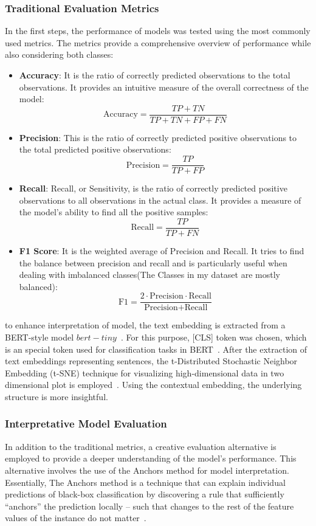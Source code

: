 \documentclass[11pt,a4paper]{article}
\begin{document}
\subsubsection{Traditional Evaluation Metrics}
In the first steps, the performance of models was tested using the most commonly used metrics. The metrics provide a comprehensive overview of performance while also considering both classes:
\begin{itemize}
    \item \textbf{Accuracy}: It is the ratio of correctly predicted observations to the total observations. It provides an intuitive measure of the overall correctness of the model:
    $$
    \text{Accuracy} = \frac{TP+TN}{TP+TN+FP+FN}
    $$
    \item \textbf{Precision}: This is the ratio of correctly predicted positive observations to the total predicted positive observations:
    $$
    \text{Precision} = \frac{TP}{TP+FP}
    $$
    \item \textbf{Recall}: Recall, or Sensitivity, is the ratio of correctly predicted positive observations to all observations in the actual class. It provides a measure of the model’s ability to find all the positive samples:
    $$
    \text{Recall} = \frac{TP}{TP+FN}
    $$
    \item \textbf{F1 Score}: It is the weighted average of Precision and Recall. It tries to find the balance between precision and recall and is particularly useful when dealing with imbalanced classes(The Classes in my dataset are mostly balanced):
    $$
    \text{F1} = \frac{2 \cdot \text{Precision} \cdot \text{Recall}}{\text{Precision} + \text{Recall}}
    $$
\end{itemize}
to enhance interpretation of model, the text embedding is extracted from a BERT-style model $bert-tiny$~\cite{iulia turc_chang_lee_toutanova_2019, bhargava_drozd_rogers_2021}. For this purpose, [CLS] token was chosen, which is an special token used for classification tasks in BERT~\cite{devlin_chang_lee_toutanova_2018}. After the extraction of text embeddings representing sentences, the t-Distributed Stochastic Neighbor Embedding (t-SNE) technique for visualizing high-dimensional data in two dimensional plot is employed~\cite{com_hinton_2008, arora_hu_kothari_2018}. Using the contextual embedding, the underlying structure is more insightful.
\subsubsection{Interpretative Model Evaluation}
In addition to the traditional metrics, a creative evaluation alternative is employed to provide a deeper understanding of the model’s performance. This alternative involves the use of the Anchors method for model interpretation.
Essentially, The Anchors method is a technique that can explain individual predictions of black-box classification by discovering a rule that sufficiently “anchors” the prediction locally – such that changes to the rest of the feature values of the instance do not matter~\cite{ribeiro_2018_anchors}.
\end{document}
